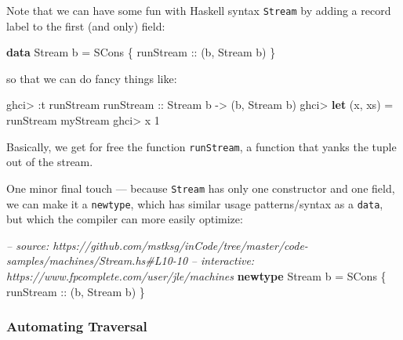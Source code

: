 \documentclass[]{article}
\newenvironment{Shaded}{}{}
\newcommand{\KeywordTok}[1]{\textcolor[rgb]{0.00,0.44,0.13}{\textbf{{#1}}}}
\newcommand{\DataTypeTok}[1]{\textcolor[rgb]{0.56,0.13,0.00}{{#1}}}
\newcommand{\DecValTok}[1]{\textcolor[rgb]{0.25,0.63,0.44}{{#1}}}
\newcommand{\CommentTok}[1]{\textcolor[rgb]{0.38,0.63,0.69}{\textit{{#1}}}}
\newcommand{\OtherTok}[1]{\textcolor[rgb]{0.00,0.44,0.13}{{#1}}}
\newcommand{\FunctionTok}[1]{\textcolor[rgb]{0.02,0.16,0.49}{{#1}}}
\newcommand{\NormalTok}[1]{{#1}}
\begin{document}
Note that we can have some fun with Haskell syntax \texttt{Stream} by adding a
record label to the first (and only) field:

\begin{Shaded}
\begin{Highlighting}[]
\KeywordTok{data} \DataTypeTok{Stream} \NormalTok{b }\FunctionTok{=} \DataTypeTok{SCons} \NormalTok{\{}\OtherTok{ runStream ::} \NormalTok{(b, }\DataTypeTok{Stream} \NormalTok{b) \}}
\end{Highlighting}
\end{Shaded}

so that we can do fancy things like:

\begin{Shaded}
\begin{Highlighting}[]
\NormalTok{ghci}\FunctionTok{>} \FunctionTok{:}\NormalTok{t runStream}
\OtherTok{runStream ::} \DataTypeTok{Stream} \NormalTok{b }\OtherTok{->} \NormalTok{(b, }\DataTypeTok{Stream} \NormalTok{b)}
\NormalTok{ghci}\FunctionTok{>} \KeywordTok{let} \NormalTok{(x, xs) }\FunctionTok{=} \NormalTok{runStream myStream}
\NormalTok{ghci}\FunctionTok{>} \NormalTok{x}
\DecValTok{1}
\end{Highlighting}
\end{Shaded}

Basically, we get for free the function \texttt{runStream}, a function that
yanks the tuple out of the stream.

One minor final touch --- because \texttt{Stream} has only one constructor and
one field, we can make it a \texttt{newtype}, which has similar usage
patterns/syntax as a \texttt{data}, but which the compiler can more easily
optimize:

\begin{Shaded}
\begin{Highlighting}[]
\CommentTok{-- source: https://github.com/mstksg/inCode/tree/master/code-samples/machines/Stream.hs#L10-10}
\CommentTok{-- interactive: https://www.fpcomplete.com/user/jle/machines}
\KeywordTok{newtype} \DataTypeTok{Stream} \NormalTok{b }\FunctionTok{=} \DataTypeTok{SCons} \NormalTok{\{}\OtherTok{ runStream ::} \NormalTok{(b, }\DataTypeTok{Stream} \NormalTok{b) \}}
\end{Highlighting}
\end{Shaded}

\subsubsection{Automating Traversal}\label{automating-traversal}
\end{document}
